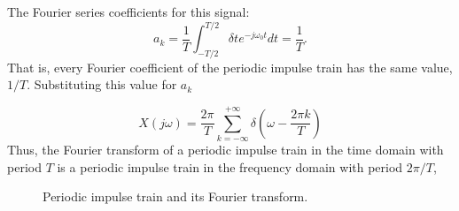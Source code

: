 \begin{frame}
    {
        The Fourier series coefficients for this signal:
        \begin{equation*}
            a_k = \frac{1}{T}\int_{-T/2}^{T/2} \delta{t}e^{-j\omega_0 t}dt = \frac{1}{T}.
        \end{equation*}
        That is, every Fourier coefficient of the periodic impulse train has the same value, $1/T$. Substituting this value for $a_k$
    \pause
    \pause
        \begin{equation*}
            X(j\omega) = \frac{2\pi}{T} \sum_{k=-\infty}^{+\infty}\delta\left(\omega - \frac{2\pi k}{T}\right)
        \end{equation*}
    \pause
    Thus, the Fourier transform of a periodic impulse train in the time domain with period $T$ is a periodic impulse train in the frequency domain with period $2\pi/T$,
    }
\end{frame}

\begin{frame}
    \begin{figure}
        \centering
        
        \caption{Periodic impulse train and its Fourier transform.}\label{fi:ft_pulse_train}
    \end{figure}
\end{frame}



